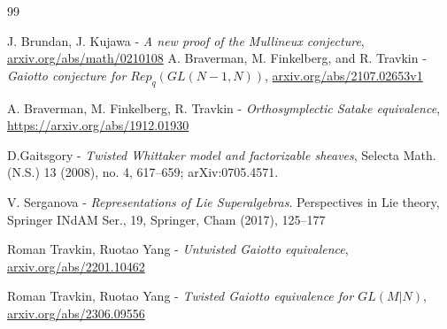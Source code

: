 \documentclass[12pt]{amsart}
\numberwithin{equation}{section}
\numberwithin{equation}{section}
\theoremstyle{definition}
\begin{document}



\begin{thebibliography}{99}

 J. Brundan, J. Kujawa  - \textit{A new proof of the Mullineux conjecture}, \url{arxiv.org/abs/math/0210108}
A. Braverman, M. Finkelberg, and R. Travkin - \textit{Gaiotto conjecture for $Rep_q(GL(N-1,N))$}, \url{arxiv.org/abs/2107.02653v1}

A. Braverman, M. Finkelberg, R. Travkin - \textit{Orthosymplectic Satake equivalence}, \url{https://arxiv.org/abs/1912.01930}

D.Gaitsgory - \textit{Twisted Whittaker model and factorizable sheaves}, Selecta Math. (N.S.) 13
(2008), no. 4, 617–659; arXiv:0705.4571.

 V. Serganova - \textit{Representations of Lie Superalgebras}. Perspectives in Lie theory, Springer INdAM
Ser., 19, Springer, Cham (2017), 125–177

Roman Travkin, Ruotao Yang - \textit{Untwisted Gaiotto equivalence}, 	\url{arxiv.org/abs/2201.10462}

Roman Travkin, Ruotao Yang - \textit{Twisted Gaiotto equivalence for $GL(M|N)$}, 	\url{arxiv.org/abs/2306.09556}




\end{thebibliography}
\end{document}
